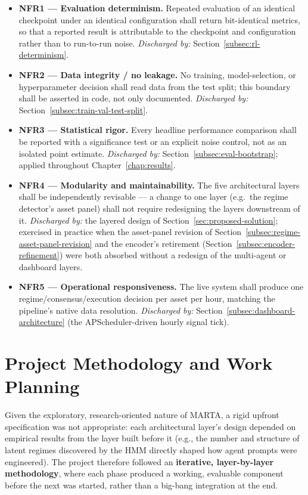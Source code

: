 \begin{itemize}
    \item \textbf{NFR1 --- Evaluation determinism.} Repeated evaluation of an identical checkpoint under an identical configuration shall return bit-identical metrics, so that a reported result is attributable to the checkpoint and configuration rather than to run-to-run noise. \emph{Discharged by:} Section~\ref{subsec:rl-determinism}.
    \item \textbf{NFR2 --- Data integrity / no leakage.} No training, model-selection, or hyperparameter decision shall read data from the test split; this boundary shall be asserted in code, not only documented. \emph{Discharged by:} Section~\ref{subsec:train-val-test-split}.
    \item \textbf{NFR3 --- Statistical rigor.} Every headline performance comparison shall be reported with a significance test or an explicit noise control, not as an isolated point estimate. \emph{Discharged by:} Section~\ref{subsec:eval-bootstrap}; applied throughout Chapter~\ref{chap:results}.
    \item \textbf{NFR4 --- Modularity and maintainability.} The five architectural layers shall be independently revisable --- a change to one layer (e.g.\ the regime detector's asset panel) shall not require redesigning the layers downstream of it. \emph{Discharged by:} the layered design of Section~\ref{sec:proposed-solution}; exercised in practice when the asset-panel revision of Section~\ref{subsec:regime-asset-panel-revision} and the encoder's retirement (Section~\ref{subsec:encoder-refinement}) were both absorbed without a redesign of the multi-agent or dashboard layers.
    \item \textbf{NFR5 --- Operational responsiveness.} The live system shall produce one regime/consensus/execution decision per asset per hour, matching the pipeline's native data resolution. \emph{Discharged by:} Section~\ref{subsec:dashboard-architecture} (the APScheduler-driven hourly signal tick).
\end{itemize}

\section{Project Methodology and Work Planning}
\label{sec:methodology-planning}

Given the exploratory, research-oriented nature of MARTA, a rigid upfront specification was not appropriate: each architectural layer's design depended on empirical results from the layer built before it (e.g., the number and structure of latent regimes discovered by the HMM directly shaped how agent prompts were engineered). The project therefore followed an \textbf{iterative, layer-by-layer methodology}, where each phase produced a working, evaluable component before the next was started, rather than a big-bang integration at the end.


